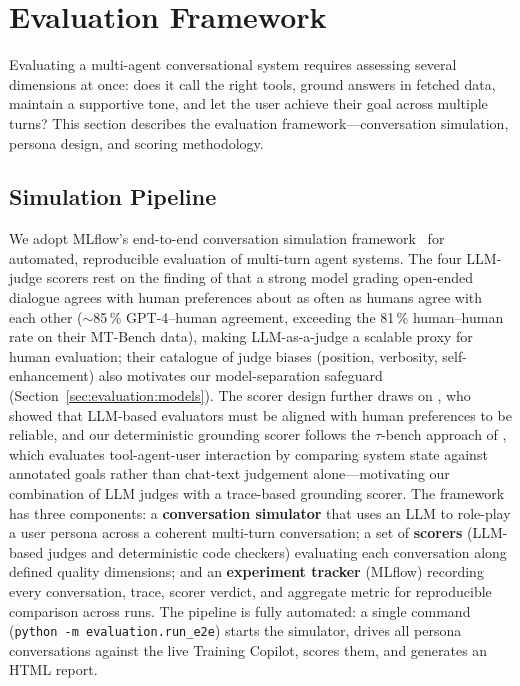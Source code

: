 \section{Evaluation Framework}\label{sec:evaluation}

Evaluating a multi-agent conversational system requires assessing several dimensions at once: does it call the right tools, ground answers in fetched data, maintain a supportive tone, and let the user achieve their goal across multiple turns? This section describes the evaluation framework---conversation simulation, persona design, and scoring methodology.

\subsection{Simulation Pipeline}\label{sec:evaluation:framework}

We adopt MLflow's end-to-end conversation simulation framework~\citep{mlflow_multiturn_2025} for automated, reproducible evaluation of multi-turn agent systems. The four LLM-judge scorers rest on the finding of \cite{zheng_judging_2023} that a strong model grading open-ended dialogue agrees with human preferences about as often as humans agree with each other ($\sim$85\,\% GPT-4--human agreement, exceeding the 81\,\% human--human rate on their MT-Bench data), making LLM-as-a-judge a scalable proxy for human evaluation; their catalogue of judge biases (position, verbosity, self-enhancement) also motivates our model-separation safeguard (Section~\ref{sec:evaluation:models}). The scorer design further draws on \cite{shankar_validates_2024}, who showed that LLM-based evaluators must be aligned with human preferences to be reliable, and our deterministic grounding scorer follows the $\tau$-bench approach of \cite{yao_taubench_2024}, which evaluates tool-agent-user interaction by comparing system state against annotated goals rather than chat-text judgement alone---motivating our combination of LLM judges with a trace-based grounding scorer. The framework has three components: a \textbf{conversation simulator} that uses an LLM to role-play a user persona across a coherent multi-turn conversation; a set of \textbf{scorers} (LLM-based judges and deterministic code checkers) evaluating each conversation along defined quality dimensions; and an \textbf{experiment tracker} (MLflow) recording every conversation, trace, scorer verdict, and aggregate metric for reproducible comparison across runs. The pipeline is fully automated: a single command (\texttt{python -m evaluation.run\_e2e}) starts the simulator, drives all persona conversations against the live Training Copilot, scores them, and generates an HTML report.

